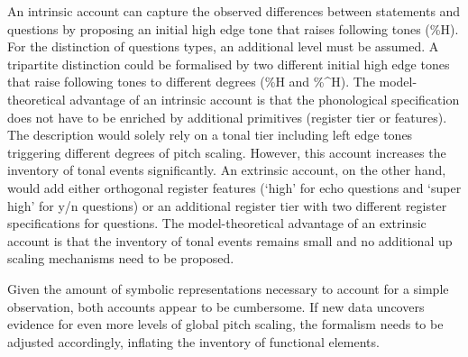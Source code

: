 An intrinsic account can capture the observed differences between statements and questions by proposing an initial high edge tone that raises following tones (\%H). For the distinction of questions types, an additional level must be assumed. A tripartite distinction could be formalised by two different initial high edge tones that raise following tones to different degrees (\%H and \%\textasciicircum H). The model-theoretical advantage of an intrinsic account is that the phonological specification does not have to be enriched by additional primitives (register tier or features). The description would solely rely on a tonal tier including left edge tones triggering different degrees of pitch scaling. However, this account increases the inventory of tonal events significantly. An extrinsic account, on the other hand, would add either orthogonal register features (‘high’ for echo questions and ‘super high’ for y/n questions) or an additional register tier with two different register specifications for questions. The model-theoretical advantage of an extrinsic account is that the inventory of tonal events remains small and no additional up scaling mechanisms need to be proposed. 

Given the amount of symbolic representations necessary to account for a simple observation, both accounts appear to be cumbersome. If new data uncovers evidence for even more levels of global pitch scaling, the formalism needs to be adjusted accordingly, inflating the inventory of functional elements.

